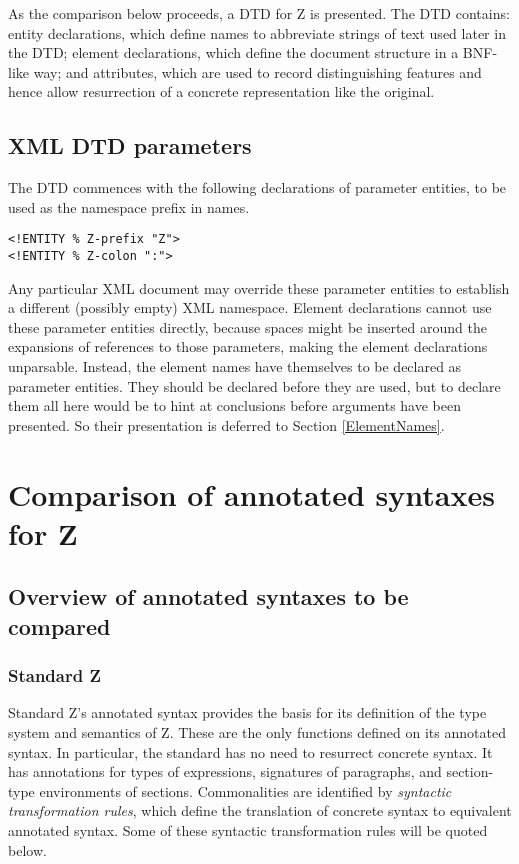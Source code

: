 \documentclass[a4paper,10pt]{article}
\begin{document}
As the comparison below proceeds, a DTD for Z is presented.
The DTD contains: entity declarations,
which define names to abbreviate strings of text used later in the DTD;
element declarations,
which define the document structure in a BNF-like way;
and attributes,
which are used to record distinguishing features
and hence allow resurrection of a concrete representation like the original.

\subsection{XML DTD parameters}\label{DTDparams}

The DTD commences with the following declarations of parameter entities,
to be used as the namespace prefix in names.
\begin{verbatim}
<!ENTITY % Z-prefix "Z">
<!ENTITY % Z-colon ":">
\end{verbatim}
Any particular XML document may override these parameter entities
to establish a different (possibly empty) XML namespace.
Element declarations cannot use these parameter entities directly,
because spaces might be inserted around
the expansions of references to those parameters,
making the element declarations unparsable.
Instead, the element names have themselves to be declared as parameter entities.
They should be declared before they are used,
but to declare them all here would be to hint at conclusions
before arguments have been presented.
So their presentation is deferred to Section \ref{ElementNames}.

\section{Comparison of annotated syntaxes for Z}

\subsection{Overview of annotated syntaxes to be compared}

\subsubsection{Standard Z}

Standard Z's annotated syntax provides the basis for its definition
of the type system and semantics of Z.
These are the only functions defined on its annotated syntax.
In particular, the standard has no need to resurrect concrete syntax.
It has annotations for types of expressions,
signatures of paragraphs, and section-type environments of sections.
Commonalities are identified by \textit{syntactic transformation rules},
which define the translation of concrete syntax to equivalent annotated syntax.
Some of these syntactic transformation rules will be quoted below.
\end{document}
